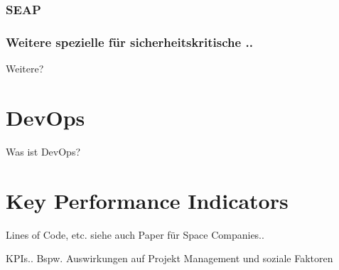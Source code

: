\subsubsection{SEAP}

\subsubsection{Weitere spezielle für sicherheitskritische ..}

Weitere?

\section{DevOps}

Was ist DevOps?

\section{Key Performance Indicators}

Lines of Code, etc.
siehe auch Paper für Space Companies..

KPIs..
Bspw. Auswirkungen auf Projekt Management und soziale Faktoren
